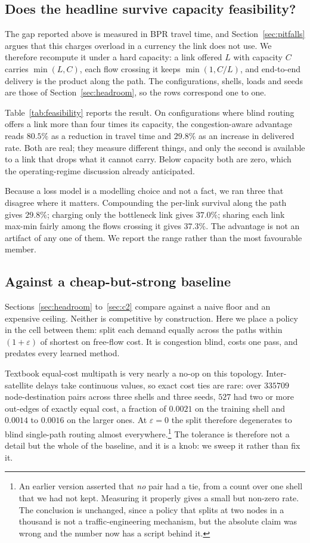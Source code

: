 \documentclass[journal]{IEEEtran}
\begin{document}
\subsection{Does the headline survive capacity feasibility?}\label{sec:feasible}

The gap reported above is measured in BPR travel time, and Section~\ref{sec:pitfalls} argues that
this charges overload in a currency the link does not use. We therefore recompute it under a hard
capacity: a link offered $L$ with capacity $C$ carries $\min(L,C)$, each flow crossing it keeps
$\min(1,C/L)$, and end-to-end delivery is the product along the path. The configurations, shells,
loads and seeds are those of Section~\ref{sec:headroom}, so the rows correspond one to one.

Table~\ref{tab:feasibility} reports the result. On configurations where blind routing offers a link
more than four times its capacity, the
congestion-aware advantage reads $80.5\%$ as a reduction in travel time and $29.8\%$ as an increase in delivered rate. Both are real; they measure different things, and only the second is available
to a link that drops what it cannot carry. Below capacity both are zero, which the operating-regime
discussion already anticipated.

Because a loss model is a modelling choice and not a fact, we ran three that disagree where it
matters. Compounding the per-link survival along the path gives $29.8\%$; charging only the bottleneck link gives $37.0\%$; sharing each link max-min fairly among the flows crossing it gives $37.3\%$. The advantage is not an artifact of any one of them. We report the range rather than the
most favourable member.

\subsection{Against a cheap-but-strong baseline}\label{sec:vs-blind}

Sections~\ref{sec:headroom} to~\ref{sec:c2} compare against a naive floor and an expensive ceiling.
Neither is competitive by construction. Here we place a policy in the cell between them: split each
demand equally across the paths within $(1+\varepsilon)$ of shortest on free-flow cost. It is
congestion blind, costs one pass, and predates every learned method.

Textbook equal-cost multipath is very nearly a no-op on this topology. Inter-satellite delays
take continuous values, so exact cost ties are rare: over $335709$ node-destination pairs across
three shells and three seeds, $527$ had two or more out-edges of exactly equal cost, a fraction of
$0.0021$ on the training shell and $0.0014$ to $0.0016$ on the larger ones. At $\varepsilon=0$ the
split therefore degenerates to blind single-path routing almost everywhere.\footnote{An earlier
version asserted that \emph{no} pair had a tie, from a count over one shell that we had not kept.
Measuring it properly gives a small but non-zero rate. The conclusion is unchanged, since a policy
that splits at two nodes in a thousand is not a traffic-engineering mechanism, but the absolute
claim was wrong and the number now has a script behind it.} The tolerance is therefore not a
detail but the whole of the baseline, and it is a knob: we sweep it rather than fix it.
\end{document}
